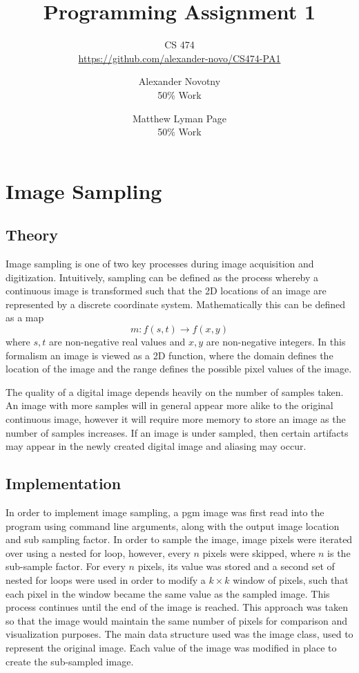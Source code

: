 \documentclass[headings=optiontoheadandtoc,listof=totoc,parskip=full]{scrartcl}
\title{Programming Assignment 1}
\subtitle{CS 474\\\url{https://github.com/alexander-novo/CS474-PA1}}
\author{Alexander Novotny\\50\% Work \and Matthew Lyman Page\\50\% Work}
\begin{document}
\maketitle
\tableofcontents
{}

\newpage
{}

\section{Image Sampling}

\subsection{Theory}
Image sampling is one of two key processes during image acquisition and digitization. Intuitively, sampling can be defined as the process whereby a continuous image is transformed such that the 2D locations of an image are represented by a discrete coordinate system. Mathematically this can be defined as a map \[
	m:f(s, t) \rightarrow f(x, y)
\]where $s, t$ are non-negative real values and $x, y$ are non-negative integers. In this formalism an image is viewed as a 2D function, where the domain defines the location of the image and the range defines the possible pixel values of the image.

The quality of a digital image depends heavily on the number of samples taken. An image with more samples will in general appear more alike to the original continuous image, however it will require more memory to store an image as the number of samples increases. If an image is under sampled, then certain artifacts may appear in the newly created digital image and aliasing may occur.

\subsection{Implementation}
In order to implement image sampling, a pgm image was first read into the program using command line arguments, along with the output image location and sub sampling factor. In order to sample the image, image pixels were iterated over using a nested for loop, however, every $n$ pixels were skipped, where $n$ is the sub-sample factor. For every $n$ pixels, its value was stored and a second set of nested for loops were used in order to modify a $k \times k$ window of pixels, such that each pixel in the window became the same value as the sampled image. This process continues until the end of the image is reached. This approach was taken so that the image would maintain the same number of pixels for comparison and visualization purposes. The main data structure used was the image class, used to represent the original image. Each value of the image was modified in place to create the sub-sampled image.
\end{document}
